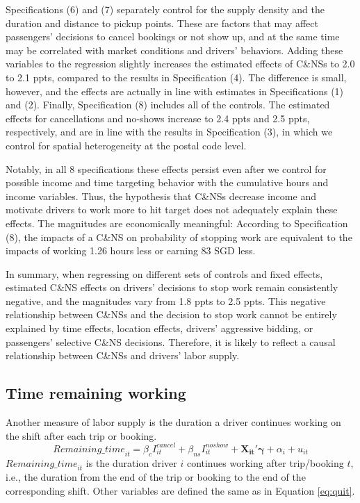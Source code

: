 \documentclass[reviewmode]{restud}
\begin{document}
Specifications (6) and (7) separately control for the supply density %
 and the duration and distance to pickup points. These are factors that may affect passengers' decisions to cancel bookings or not show up, and at the same time may be correlated with market conditions and drivers' behaviors.  Adding these variables to the regression slightly increases the estimated effects of C\&NSs to 2.0 to 2.1 ppts, compared to the results in Specification (4). The difference is small, however, and the effects are actually in line with estimates in Specifications (1) and (2).  Finally, Specification (8) includes all of the controls. The estimated effects for cancellations and no-shows increase to 2.4 ppts and 2.5 ppts, respectively, 
and are in line with the results in Specification (3), in which we control for spatial heterogeneity at the postal code level.

Notably, in all 8 specifications these effects persist even after we control for possible income and time targeting behavior with the cumulative hours and income variables. Thus, the hypothesis that C\&NSs decrease income and motivate drivers to work more to hit target does not adequately explain these effects. The magnitudes are economically meaningful: According to Specification (8), the impacts of a C\&NS on probability of stopping work are equivalent to the impacts of working 1.26 hours less or earning 83 SGD less.

In summary, when regressing on different sets of controls and fixed effects, estimated C\&NS effects on drivers' decisions to stop work remain consistently negative, and the magnitudes vary
from 1.8 ppts to 2.5 ppts. This negative relationship between C\&NSs and the decision to stop work cannot be entirely explained by time effects, location effects, drivers' aggressive bidding, or passengers' selective C\&NS decisions. Therefore, it is likely to reflect a causal relationship between C\&NSs and drivers' labor supply.

\subsection{Time remaining working}
Another measure of labor supply is the duration a driver continues working on the shift after each trip or booking. 
\begin{equation}
\label{eq:rmins}
{Remaining\_time}_{it} = \beta_c I^{cancel}_{it} + \beta_{ns} I^{noshow}_{it}  + \mathbf{X_{it}}'\mathbf{\gamma} + \alpha_i + u_{it}
\end{equation}
${Remaining\_time}_{it}$ is the duration driver $i$ continues working after trip/booking $t$, i.e., the duration from the end of the trip or booking to the end of the corresponding shift. %
Other variables are defined the same as in Equation \eqref{eq:quit}.
\end{document}
